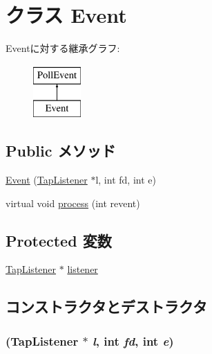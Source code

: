 \hypertarget{classTapListener_1_1Event}{
\section{クラス Event}
\label{classTapListener_1_1Event}
}
Eventに対する継承グラフ:\begin{figure}[H]
\begin{center}
\leavevmode
\includegraphics[height=2cm]{classTapListener_1_1Event}
\end{center}
\end{figure}
\subsection*{Public メソッド}
\begin{DoxyCompactItemize}
\item 
\hyperlink{classTapListener_1_1Event_aaec22ed99296ac6734f1a8e3e709129c}{Event} (\hyperlink{classTapListener}{TapListener} $\ast$l, int fd, int e)
\item 
virtual void \hyperlink{classTapListener_1_1Event_a2b093972df00400e2325baed216afc46}{process} (int revent)
\end{DoxyCompactItemize}
\subsection*{Protected 変数}
\begin{DoxyCompactItemize}
\item 
\hyperlink{classTapListener}{TapListener} $\ast$ \hyperlink{classTapListener_1_1Event_a63f477b36e686c92354d58f1c89733e4}{listener}
\end{DoxyCompactItemize}


\subsection{コンストラクタとデストラクタ}
\hypertarget{classTapListener_1_1Event_aaec22ed99296ac6734f1a8e3e709129c}{
\subsubsection[{Event}]{ ({\bf TapListener} $\ast$ {\em l}, \/  int {\em fd}, \/  int {\em e})}}
\label{classTapListener_1_1Event_aaec22ed99296ac6734f1a8e3e709129c}



